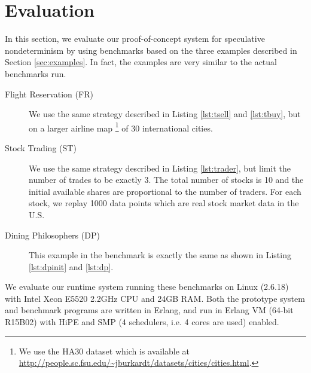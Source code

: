 \section{Evaluation}\label{sec:experiment}

In this section, we evaluate our proof-of-concept system 
for speculative nondeterminism by using benchmarks based on
the three examples described in Section \ref{sec:examples}.
In fact, the examples are very similar to the actual benchmarks run.

\begin{description}
\item[Flight Reservation (FR)]
We use the same strategy described in Listing \ref{lst:tsell}
and \ref{lst:tbuy}, but on a larger airline map
\footnote{We use the HA30 dataset which is available 
at \url{http://people.sc.fsu.edu/~jburkardt/datasets/cities/cities.html}.}
of 30 international cities. 
\item[Stock Trading (ST)]
We use the same strategy described in Listing \ref{lst:trader},
but limit the number of trades to be exactly 3. 
The total number of stocks is 10 and the initial available shares
are proportional to the number of traders. 
For each stock, we replay 1000 data points which are real stock market
data in the U.S.
\item[Dining Philosophers (DP)]
This example in the benchmark is exactly the same as shown in 
Listing \ref{lst:dpinit} and \ref{lst:dp}.
\end{description}

We evaluate our runtime system running these benchmarks
on Linux (2.6.18) with Intel Xeon E5520 2.2GHz CPU and 24GB RAM.
Both the prototype system and benchmark programs are written in Erlang,
and run in Erlang VM (64-bit R15B02) with HiPE and SMP (4 schedulers, i.e. 4 cores are used) enabled.

